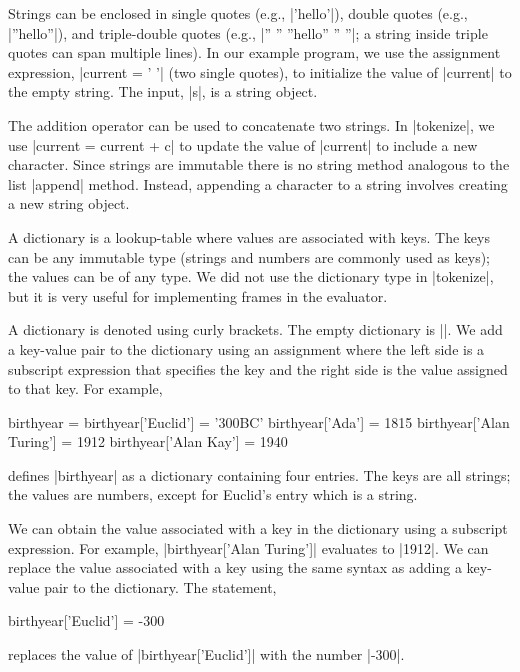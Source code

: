 Strings can be enclosed in single quotes (e.g., \pycode|'hello'|), double quotes (e.g., \pycode|''hello''|), and triple-double quotes (e.g., \pycode|'' '' ''hello'' '' ''|; a string inside triple quotes can span multiple lines).  In our example program, we use the assignment expression, \pycode|current = ' '| (two single quotes), to initialize the value of \pycode|current| to the empty string.   The input, \pycode|s|, is a string object.

The addition operator can be used to concatenate two strings.  In \pycode|tokenize|, we use \pycode|current = current + c| to update the value of \pycode|current| to include a new character.  Since strings are immutable there is no string method analogous to the list \pycode|append| method.  Instead, appending a character to a string involves creating a new string object.

  A dictionary is a lookup-table where values are associated with keys.  The keys can be any immutable type (strings and numbers are commonly used as keys); the values can be of any type.  We did not use the dictionary type in \pycode|tokenize|, but it is very useful for implementing frames in the evaluator.

A dictionary is denoted using curly brackets.  The empty dictionary is \pycode|{}|.  We add a key-value pair to the dictionary using an assignment where the left side is a subscript expression that specifies the key and the right side is the value assigned to that key.  For example,
\begin{pythoncode}
birthyear = {} 
birthyear['Euclid'] = '300BC'
birthyear['Ada'] = 1815
birthyear['Alan Turing'] = 1912
birthyear['Alan Kay'] = 1940
\end{pythoncode}
defines \pycode|birthyear| as a dictionary containing four entries.  The keys are all strings; the values are numbers, except for Euclid's entry which is a string.

We can obtain the value associated with a key in the dictionary using a subscript expression.  For example, \pycode|birthyear['Alan Turing']| evaluates to \pycode|1912|.  We can replace the value associated with a key using the same syntax as adding a key-value pair to the dictionary.  The statement,
\begin{pythoncode}
birthyear['Euclid'] = -300
\end{pythoncode}
replaces the value of \pycode|birthyear['Euclid']| with the number \pycode|-300|.

